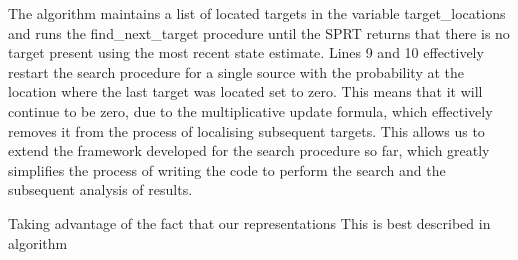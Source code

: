 The algorithm maintains a list of located targets in the variable target\_locations and runs the find\_next\_target procedure until the SPRT returns that there is no target present using the most recent state estimate. Lines 9 and 10 effectively restart the search procedure for a single source with the probability at the location where the last target was located set to zero. This means that it will continue to be zero, due to the multiplicative update formula, which effectively removes it from the process of localising subsequent targets. This allows us to extend the framework developed for the search procedure so far, which greatly simplifies the process of writing the code to perform the search and the subsequent analysis of results.

Taking advantage of the fact that our representations  This is best described in algorithm
